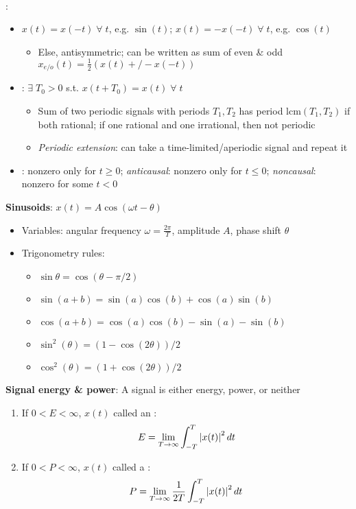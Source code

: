 \documentclass[12pt]{extarticle}
\begin{document}
~\\ \newp
{}: \begin{itemize}
    \item {} $x(t)=x(-t)\;\forall\;t$, e.g. $\sin(t)$;  $x(t)=-x(-t)\;\forall\;t$, e.g. $\cos(t)$ \begin{itemize}
        \item Else, antisymmetric; can be written as sum of even \& odd $x_{e/o}(t)=\frac{1}{2}(x(t)+/-x(-t))$
    \end{itemize}
    \item {}: $\exists\;T_0>0$ s.t. $x(t+T_0)=x(t)\;\forall\;t$ \begin{itemize}
        \item Sum of two periodic signals with periods $T_1,T_2$ has period $\text{lcm}(T_1,T_2)$ if both rational; if one rational and one irrational, then not periodic
        \item \textit{Periodic extension}: can take a time-limited/aperiodic signal and repeat it
    \end{itemize}
    \item {}: nonzero only for $t\geq0$; \textit{anticausal}: nonzero only for $t\leq0$; \textit{noncausal}: nonzero for some $t<0$
\end{itemize}

\newp
\textbf{Sinusoids}: $x(t)=A\cos(\omega t-\theta)$ \begin{itemize}
    \item Variables: angular frequency $\omega=\frac{2\pi}{T}$, amplitude $A$, phase shift $\theta$
    \item Trigonometry rules: \begin{itemize}
        \item $\sin\theta=\cos(\theta-\pi/2)$
        \item $\sin(a+b)=\sin(a)\cos(b)+\cos(a)\sin(b)$
        \item $\cos(a+b)=\cos(a)\cos(b)-\sin(a)-\sin(b)$
        \item $\sin^2(\theta)=(1-\cos(2\theta))/2$
        \item $\cos^2(\theta)=(1+\cos(2\theta))/2$
    \end{itemize}
\end{itemize}

\newp
\textbf{Signal energy \& power}: A signal is either energy, power, or neither \begin{enumerate}
    \item If $0<E<\infty$, $x(t)$ called an : \begin{align*}
        E=\lim_{T\to\infty}\int_{-T}^T\left|x(t)\right|^2dt
    \end{align*}
    \item If $0<P<\infty$, $x(t)$ called a : \begin{align*}
        P=\lim_{T\to\infty}\frac{1}{2T}\int_{-T}^T\left|x(t)\right|^2dt
    \end{align*}
\end{enumerate}
\end{document}
